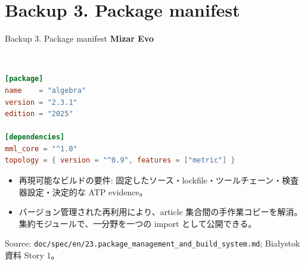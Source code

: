 \documentclass[dvipdfmx,aspectratio=169,11pt]{beamer}
\newcommand{\statusbadge}[2]{\colorbox{#1}{\textcolor{white}{\strut\scriptsize\sffamily\bfseries #2}}}
\newcommand{\badgeSpec}{\statusbadge{green!35!black}{specification example}}
\begin{document}
\section{Backup 3. Package manifest}
\begin{frame}[fragile,t]{Backup 3. Package manifest}
\smallskip
\textbf{Mizar Evo}~\badgeSpec
\begin{lstlisting}[language={toml},basicstyle=\ttfamily\footnotesize]
[package]
name    = "algebra"
version = "2.3.1"
edition = "2025"

[dependencies]
mml_core = "^1.0"
topology = { version = "^0.9", features = ["metric"] }
\end{lstlisting}
\begin{itemize}
\setlength{\itemsep}{1pt}
\setlength{\parsep}{0pt}
\setlength{\parskip}{0pt}
\item 再現可能なビルドの要件: 固定したソース・lockfile・ツールチェーン・検査器設定・決定的な ATP evidence。
\item バージョン管理された再利用により、article 集合間の手作業コピーを解消。集約モジュールで、一分野を一つの import として公開できる。
\end{itemize}
Source: \texttt{doc/spec/en/23.package\_management\_and\_build\_system.md}; Bia\l{}ystok 資料 Story 1。

\end{frame}
\end{document}
